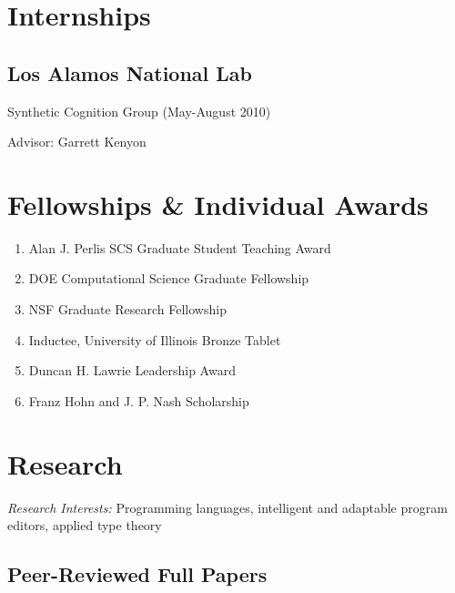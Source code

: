 \documentclass[10pt,letterpaper]{article}
\renewenvironment{itemize}{
  \begin{list}{}{
    \setlength{\leftmargin}{1.5em}
    \setlength{\itemsep}{0.25em}
    \setlength{\parskip}{0pt}
    \setlength{\parsep}{0.25em}
  }
}{
  \end{list}
}
\begin{document}
\section*{Internships}
\subsection*{Los Alamos National Lab}
  \begin{itemize}
    \item Synthetic Cognition Group (May-August 2010)
    \item Advisor: Garrett Kenyon
  \end{itemize}

  \section*{Fellowships \& Individual Awards}
\begin{enumerate}
  \item {Alan J. Perlis SCS Graduate Student Teaching Award}%
  \item DOE Computational Science Graduate Fellowship %
  \item NSF Graduate Research Fellowship %
  \item Inductee, University of Illinois Bronze Tablet %
  \item Duncan H. Lawrie Leadership Award %
  \item Franz Hohn and J. P. Nash Scholarship
\end{enumerate}


\section*{Research}

\textit{Research Interests:} Programming languages, intelligent and adaptable program editors, applied type theory

\vspace{-6px}
\subsection*{Peer-Reviewed Full Papers}
\end{document}
